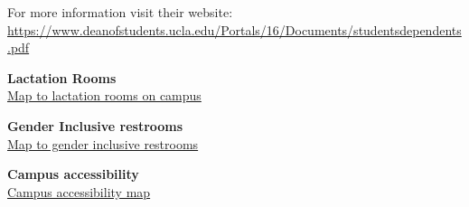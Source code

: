\documentclass[11pt,]{article}
\begin{document}
For more information visit their website:
\url{https://www.deanofstudents.ucla.edu/Portals/16/Documents/studentsdependents.pdf}

\textbf{Lactation Rooms}\\
\href{https://map.ucla.edu/?f=5}{Map to lactation rooms on campus}

\textbf{Gender Inclusive restrooms}\\
\href{http://maps.ucla.edu/campus/?a_layers=flyr_restrooms}{Map to
gender inclusive restrooms}

\textbf{Campus accessibility}\\
\href{https://maps.ucla.edu/downloads/pdf/Access_08_21_15.pdf}{Campus
accessibility map}
\end{document}
